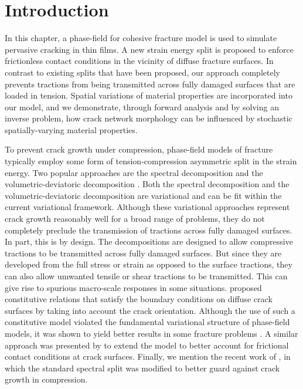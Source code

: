 \section{Introduction}
\label{section: Chapter4/intro}

In this chapter, a phase-field for cohesive fracture model is used to simulate pervasive cracking in thin films. A new strain energy split is proposed to enforce frictionless contact conditions in the vicinity of diffuse fracture surfaces. In contrast to existing splits that have been proposed, our approach completely prevents tractions from being transmitted across fully damaged surfaces that are loaded in tension. Spatial variations of material properties are incorporated into our model, and we demonstrate, through forward analysis and by solving an inverse problem, how crack network morphology can be influenced by stochastic spatially-varying material properties.

To prevent crack growth under compression, phase-field models of fracture typically employ some form of tension-compression asymmetric split in the strain energy. Two popular approaches are the spectral decomposition \cite{miehe_2010_p1, miehe_2010_p2} and the volumetric-deviatoric decomposition \cite{AMOR20091209}. Both the spectral decomposition and the volumetric-deviatoric decomposition are variational and can be fit within the current variational framework.
Although these variational approaches represent crack growth reasonably well for a broad range of problems, they do not completely preclude the transmission of tractions across fully damaged surfaces.   In part, this is by design.  The decompositions are designed to allow compressive tractions to be transmitted across fully damaged surfaces.  But since they are developed from the full stress or strain as opposed to the surface tractions, they can also allow umwanted tensile or shear tractions to be transmitted. This can give rise to spurious macro-scale responses in some situations.
\citet{strobl2015novel} proposed constitutive relations that satisfy the boundary conditions on diffuse crack surfaces by taking into account the crack orientation. Although the use of such a constitutive model violated the fundamental variational structure of phase-field models, it was shown to yield better results in some fracture problems \cite{strobl2016constitutive}.  A similar approach was presented by  \citet{fei2019phase, fei2020phasefield} to extend the model to better account for frictional contact conditions at crack surfaces.  Finally, we mention the recent work of \citet{Landis-fatigue}, in which the standard spectral split was modified to better guard against crack growth in compression.

